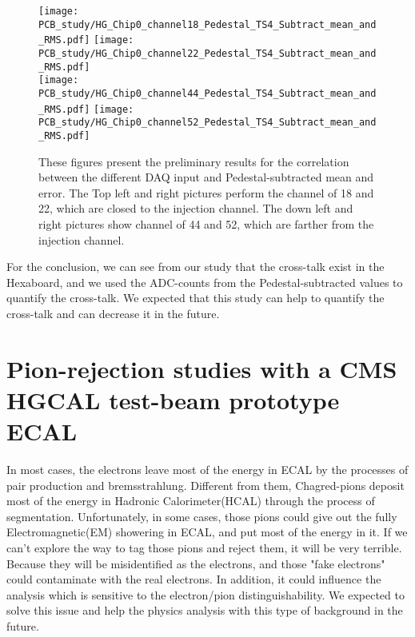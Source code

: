 \documentclass[12pt,twoside,a4paper,an,final]{cms-tdr}
\begin{document}
\begin{figure}[!htb]
\centering
     \texttt{[image: PCB\_study/HG\_Chip0\_channel18\_Pedestal\_TS4\_Subtract\_mean\_and\_RMS.pdf]}
     \texttt{[image: PCB\_study/HG\_Chip0\_channel22\_Pedestal\_TS4\_Subtract\_mean\_and\_RMS.pdf]}\\
     \texttt{[image: PCB\_study/HG\_Chip0\_channel44\_Pedestal\_TS4\_Subtract\_mean\_and\_RMS.pdf]}
     \texttt{[image: PCB\_study/HG\_Chip0\_channel52\_Pedestal\_TS4\_Subtract\_mean\_and\_RMS.pdf]}
\caption{These figures present the preliminary results for the correlation between the different DAQ input and Pedestal-subtracted mean and error. The Top left and right pictures perform the channel of 18 and 22, which are closed to the injection channel. The down left and right pictures show channel of 44 and 52, which are farther from the injection channel.}
\label{fig:PCB_injection_pulse_study}
\end{figure}

For the conclusion, we can see from our study that the cross-talk exist in the Hexaboard, and we used the ADC-counts from the Pedestal-subtracted values to quantify the cross-talk. We expected that this study can help to quantify the cross-talk and can decrease it in the future.

\section{Pion-rejection studies with a CMS HGCAL test-beam prototype ECAL}
In most cases, the electrons leave most of the energy in ECAL by the processes of pair production and bremsstrahlung. Different from them, Chagred-pions deposit most of the energy in Hadronic Calorimeter(HCAL) through the process of segmentation. Unfortunately, in some cases, those pions could give out the fully Electromagnetic(EM) showering in ECAL, and put most of the energy in it. If we can't explore the way to tag those pions and reject them, it will be very terrible. Because they will be misidentified as the electrons, and those "fake electrons" could contaminate with the real electrons.  In addition, it could influence the analysis which is sensitive to the electron/pion distinguishability. We expected to solve this issue and help the physics analysis with this type of background in the future.
\end{document}
